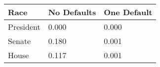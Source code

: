\begin{tabularx}{.4\textwidth}{lXX}
  \toprule
Race & No \newline Defaults & One \newline Default \\ 
  \midrule
President & 0.000 & 0.000 \\ 
  Senate & 0.180 & 0.001 \\ 
  House & 0.117 & 0.001 \\ 
   \bottomrule
\end{tabularx}
